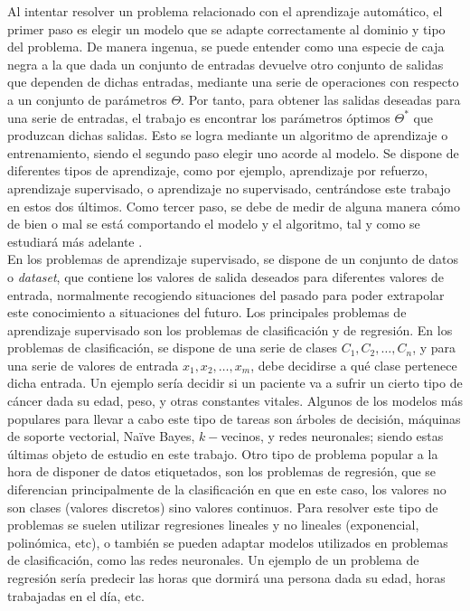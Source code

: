 	Al intentar resolver un problema relacionado con el aprendizaje automático, el primer paso es elegir un modelo que se adapte correctamente al dominio y tipo del problema. De manera ingenua, se puede entender como una especie de caja negra a la que dada un conjunto de entradas devuelve otro conjunto de salidas que dependen de dichas entradas, mediante una serie de operaciones con respecto a un conjunto de parámetros $\Theta$. Por tanto, para obtener las salidas deseadas para una serie de entradas, el trabajo es encontrar los parámetros óptimos $\Theta^*$ que produzcan dichas salidas. Esto se logra mediante un algoritmo de aprendizaje o entrenamiento, siendo el segundo paso elegir uno acorde al modelo. Se dispone de diferentes tipos de aprendizaje, como por ejemplo, aprendizaje por refuerzo, aprendizaje supervisado, o aprendizaje no supervisado, centrándose este trabajo en estos dos últimos. Como tercer paso, se debe de medir de alguna manera cómo de bien o mal se está comportando el modelo y el algoritmo, tal y como se estudiará más adelante \cite{Szeliski}. \\
	
	En los problemas de aprendizaje supervisado, se dispone de un conjunto de datos o \textit{dataset}, que contiene los valores de salida deseados para diferentes valores de entrada, normalmente recogiendo situaciones del pasado para poder extrapolar este conocimiento a situaciones del futuro. Los principales problemas de aprendizaje supervisado son los problemas de clasificación y de regresión. En los problemas de clasificación, se dispone de una serie de clases $C_1, C_2, \hdots, C_n$, y para una serie de valores de entrada $x_1, x_2, \hdots, x_m$, debe decidirse a qué clase pertenece dicha entrada. Un ejemplo sería decidir si un paciente va a sufrir un cierto tipo de cáncer dada su edad, peso, y otras constantes vitales. Algunos de los modelos más populares para llevar a cabo este tipo de tareas son árboles de decisión, máquinas de soporte vectorial, Naïve Bayes, $k-$vecinos, y redes neuronales; siendo estas últimas objeto de estudio en este trabajo. Otro tipo de problema popular a la hora de disponer de datos etiquetados, son los problemas de regresión, que se diferencian principalmente de la clasificación en que en este caso, los valores no son clases (valores discretos) sino valores continuos. Para resolver este tipo de problemas se suelen utilizar regresiones lineales y no lineales (exponencial, polinómica, etc), o también se pueden adaptar modelos utilizados en problemas de clasificación, como las redes neuronales. Un ejemplo de un problema de regresión sería predecir las horas que dormirá una persona dada su edad, horas trabajadas en el día, etc. \\
	
